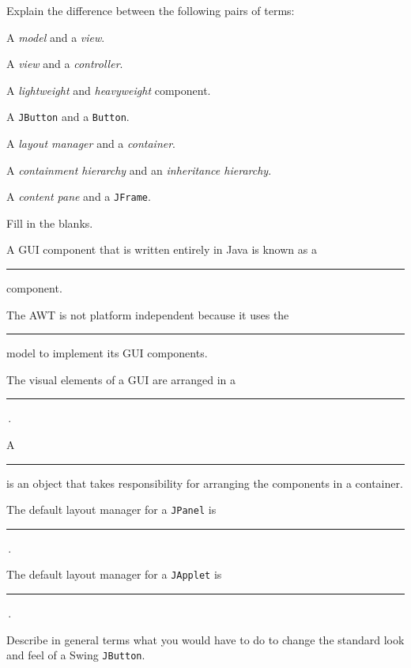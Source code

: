 \begin{EXRtwo}

\item  Explain the difference between the following pairs of terms:

\begin{EXRtwoLL}
\item  A {\it model} and a {\it view}.
\item  A {\it view} and a {\it controller}.
\item  A {\it lightweight} and {\it heavyweight} component.
\item  A {\tt JButton} and a {\tt Button}.
\item  A {\it layout manager} and a {\it container}.
\item  A {\it containment hierarchy} and an {\it inheritance hierarchy}.
\item  A {\it content pane} and a {\tt JFrame}.
\end{EXRtwoLL}


\item  Fill in the blanks.

\begin{EXRtwoLL}\baselineskip=14pt
\item  A GUI component that is written entirely in Java is
known as a  \rule{40pt}{0.5pt} component.
\item   The AWT is not platform independent because it
uses the \rule{40pt}{0.5pt} model to implement its GUI components.
\item  The visual elements of a GUI are arranged in a \rule{40pt}{0.5pt}\,.
\item  A \rule{40pt}{0.5pt} is an object that takes responsibility
for arranging the components in a container.
\item  The default layout manager for a {\tt JPanel} is \rule{40pt}{0.5pt}\,.
\item  The default layout manager for a {\tt JApplet} is \rule{40pt}{0.5pt}\,.
\end{EXRtwoLL}\baselineskip=11pt

\item  Describe in general terms what you would have to do
to change the standard look and feel of a Swing {\tt JButton}.


\end{EXRtwo}
